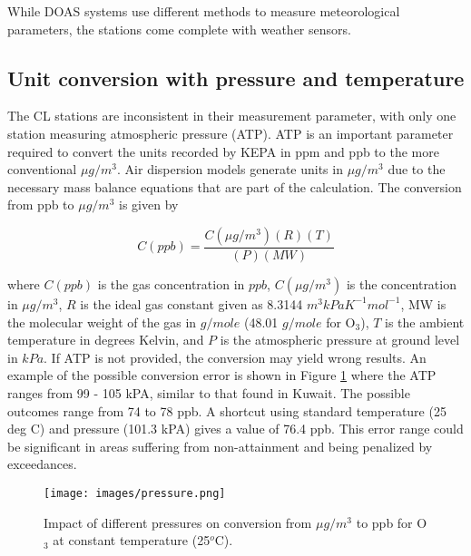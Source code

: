 While DOAS systems use different methods to measure meteorological parameters, the stations come complete with weather sensors. 

\subsection{Unit conversion with pressure and temperature}
The CL stations are inconsistent in their measurement parameter, with only one station measuring atmospheric pressure (ATP). ATP is an important parameter required to convert the units recorded by KEPA in ppm and ppb to the more conventional $\mu g/m^{3}$. Air dispersion models generate units in $\mu g/m^{3}$ due to the necessary mass balance equations that are part of the calculation. The conversion from ppb to  $\mu g/m^{3}$ is given by 

%
\begin{equation}
\label{eq:gasequation}
C(ppb) = \frac{C(\mu g/m^{3})(R) (T)}{(P) (MW)}
\end{equation}
%

\noindent
where $C(ppb)$ is the gas concentration in $ppb$, $C(\mu g/m^{3})$ is the concentration in $\mu g/m^{3}$, $R$ is the ideal gas constant given as 8.3144 $m^{3}kPa K^{-1}mol^{-1}$, MW is the molecular weight of the gas in $g/mole$ (48.01 $g/mole$ for O$_{3}$), $T$ is the ambient temperature in degrees Kelvin, and $P$ is the atmospheric pressure at ground level in $kPa$.  If ATP is not provided, the conversion may yield wrong results. An example of the possible conversion error is shown in Figure \ref{fig:pressure} where the ATP ranges from 99 - 105 kPA, similar to that found in Kuwait. The possible outcomes range from 74 to 78 ppb. A shortcut using standard temperature (25 deg C) and pressure (101.3 kPA) gives a value of 76.4 ppb. This error range could be significant in areas suffering from non-attainment and being penalized by exceedances. 
%
\begin{figure}[H]
\centering
\texttt{[image: images/pressure.png]} 
\caption[Impact of different pressures on air concentration conversion at constant temperature.]{Impact of different pressures on conversion from $\mu g/m^{3}$ to ppb for O$_{3}$ at constant temperature (25$^{o}$C).}
\label{fig:pressure}
\end{figure}
%
